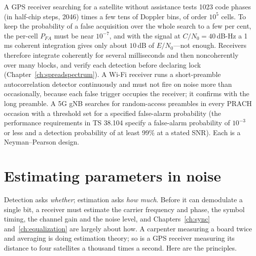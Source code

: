 \begin{inpractice}
A GPS receiver searching for a satellite without assistance tests 1023 code phases (in half-chip steps,
2046) times a few tens of Doppler bins, of order $10^5$ cells. To keep the probability of a false
acquisition over the whole search to a few per cent, the per-cell $P_{FA}$ must be near $10^{-7}$, and with
the signal at $C/N_0=40$\,dB-Hz a 1\,ms coherent integration gives only about $10$\,dB of $E/N_0$---not
enough. Receivers therefore integrate coherently for several milliseconds and then noncoherently over many
blocks, and verify each detection before declaring lock (Chapter~\ref{ch:spreadspectrum}). A Wi-Fi
receiver runs a short-preamble autocorrelation detector continuously and must not fire on noise more than
occasionally, because each false trigger occupies the receiver; it confirms with the long preamble. A 5G gNB
searches for random-access preambles in every PRACH occasion with a threshold set for a specified
false-alarm probability (the performance requirements in TS 38.104 specify a false-alarm probability of
$10^{-3}$ or less and a detection probability of at least 99\% at a stated SNR). Each is a Neyman--Pearson
design.
\end{inpractice}

\section{Estimating parameters in noise}
\label{sec:ch03:estimation}

Detection asks \emph{whether}; estimation asks \emph{how much}. Before it can demodulate a single bit, a
receiver must estimate the carrier frequency and phase, the symbol timing, the channel gain and the noise
level, and Chapters~\ref{ch:sync} and~\ref{ch:equalization} are largely about how. A carpenter measuring a
board twice and averaging is doing estimation theory; so is a GPS receiver measuring its distance to four
satellites a thousand times a second. Here are the principles.


